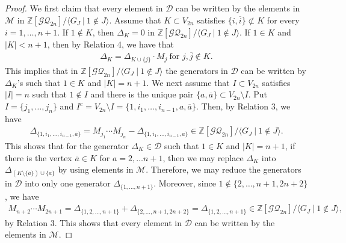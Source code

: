 \documentclass[12pt]{amsart}
\theoremstyle{remark}
\numberwithin{equation}{section}
\begin{document}
\begin{proof}
We first claim that every element in $\mathcal{D}$ can be written by the elements in $\mathcal{M}$ in $\mathbb{Z}[\mathcal{GQ}_{2n}]/\langle G_{J}\ |\ 1\not\in J \rangle$.
Assume that $K\subset V_{2n}$ satisfies $\{i, \overline{i}\}\not\subset K$ for every $i=1,\ldots, n+1$.
If $1\not\in K$, then $\Delta_{K}=0$ in $\mathbb{Z}[\mathcal{GQ}_{2n}]/\langle G_{J}\ |\ 1\not\in J \rangle$.
If $1\in K$ and $|K|< n+1$, then 
by Relation 4, we have that 
\begin{align*}
\Delta_{K}=\Delta_{K\cup \{j\}}\cdot M_{j}\ \text{for $j, \overline{j}\not\in K$}.
\end{align*}
This implies that in $\mathbb{Z}[\mathcal{GQ}_{2n}]/\langle G_{J}\ |\ 1\not\in J \rangle$ the generators in $\mathcal{D}$ can be written by 
$\Delta_{K}$'s 
such that $1\in K$ and $|K|=n+1$.
We next assume that $I\subset V_{2n}$ satisfies $|I|=n$ 
such that $1\not\in I$ and 
there is the unique pair $\{a,\overline{a}\}\subset V_{2n}\setminus I$.
Put $I=\{j_{1},\ldots, j_{n}\}$ and $I^{c}=V_{2n}\setminus I=\{1, i_{1},\ldots, i_{n-1}, a, \overline{a}\}$.
Then, by Relation 3, we have 
\begin{align*}
\Delta_{\{1,i_{1},\ldots, i_{n-1}, \overline{a}\}}=M_{j_{1}}\cdots M_{j_{n}}-\Delta_{\{1,i_{1},\ldots, i_{n-1}, a\}}\in \mathbb{Z}[\mathcal{GQ}_{2n}]/\langle G_{J}\ |\ 1\not\in J \rangle.
\end{align*}
This shows that for the generator $\Delta_{K}\in \mathcal{D}$ such that $1\in K$ and $|K|=n+1$, if there is the vertex $\overline{a}\in K$ for $a=2,\ldots n+1$, then we may replace $\Delta_{K}$ into $\Delta_{(K\setminus \{\overline{a}\})\cup \{a\}}$ by using elements in $\mathcal{M}$. 
Therefore, we may reduce the generators in $\mathcal{D}$ into only one generator 
$\Delta_{\{1,\ldots, n+1\}}$. 
Moreover, 
since $1\not\in \{2,\ldots, n+1,2n+2\}$, we have 
\begin{align*}
M_{n+2}\cdots M_{2n+1}=\Delta_{\{1,2,\ldots, n+1\}}+\Delta_{\{2,\ldots, n+1,2n+2\}}
=\Delta_{\{1,2,\ldots, n+1\}}\in \mathbb{Z}[\mathcal{GQ}_{2n}]/\langle G_{J}\ |\ 1\not\in J \rangle,
\end{align*}
by Relation 3. 
This shows that every element in $\mathcal{D}$ can be written by the elements in $\mathcal{M}$.


\end{proof}
\end{document}
